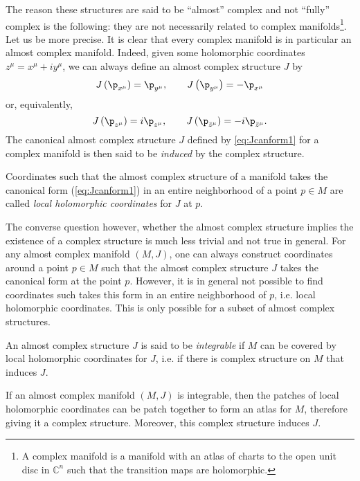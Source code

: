 \documentclass{worksheetclass}
\begin{document}
        The reason these structures are said to be ``almost'' complex and not ``fully'' complex is the following: they are not necessarily related to complex manifolds\footnote{A complex manifold is a manifold with an atlas of charts to the open unit disc in $\mathbb{C}^n$ such that the transition maps are holomorphic.}. Let us be more precise. It is clear that every complex manifold is in particular an almost complex manifold. Indeed, given some holomorphic coordinates $z^\mu=x^\mu+iy^\mu$, we can always define an almost complex structure $J$ by
        \begin{equation}
            J\left(\p_{x^\mu}\right)=\p_{y^\mu},\qquad J\left(\p_{y^\mu}\right)=-\p_{x^\mu}\label{eq:Jcanform1}
        \end{equation}
        or, equivalently,
        \begin{equation}
            J\left(\p_{z^\mu}\right)=i\p_{z^\mu},\qquad J\left(\p_{\bar{z}^\mu}\right)=-i\p_{\bar{z}^\mu}\label{eq:Jcanform2}.
        \end{equation}
        The canonical almost complex structure $J$ defined by \eqref{eq:Jcanform1} for a complex manifold is then said to be \emph{induced} by the complex structure.
        \begin{defn}
            Coordinates such that the almost complex structure of a manifold takes the canonical form (\ref{eq:Jcanform1}) in an entire neighborhood of a point $p\in M$ are called \emph{local holomorphic coordinates} for $J$ at $p$.
        \end{defn}
        
        The converse question however, whether the almost complex structure implies the existence of a complex structure is much less trivial and not true in general. For any almost complex manifold $(M,J)$, one can always construct coordinates around a point $p\in M$ such that the almost complex structure $J$ takes the canonical form at the point $p$. However, it is in general not possible to find coordinates such takes this form in an entire neighborhood of $p$, i.e. local holomorphic coordinates. This is only possible for a subset of almost complex structures.
        \begin{defn}
            An almost complex structure $J$ is said to be \emph{integrable} if $M$ can be covered by local holomorphic coordinates for $J$, i.e. if there is complex structure on $M$ that induces $J$.
        \end{defn}

        \begin{prop}
            If an almost complex manifold $(M,J)$ is integrable, then the patches of local holomorphic coordinates can be patch together to form an atlas for $M$, therefore giving it a complex structure. Moreover, this complex structure induces $J$.
        \end{prop}
\end{document}
